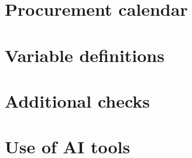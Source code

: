 \section{Procurement calendar}
\section{Variable definitions}
\section{Additional checks}
\section{Use of AI tools}
